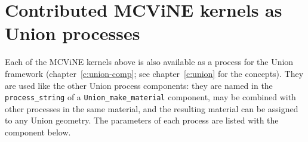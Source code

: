 
















\section{Contributed MCViNE kernels as Union processes}

Each of the MCViNE kernels above is also available as a process for the Union
framework (chapter~\ref{c:union-comp}; see chapter~\ref{c:union} for the
concepts). They are used like the other Union process components: they are
named in the \texttt{process\_string} of a \texttt{Union\_make\_material}
component, may be combined with other processes in the same material, and the
resulting material can be assigned to any Union geometry. The parameters of
each process are listed with the component below.

















